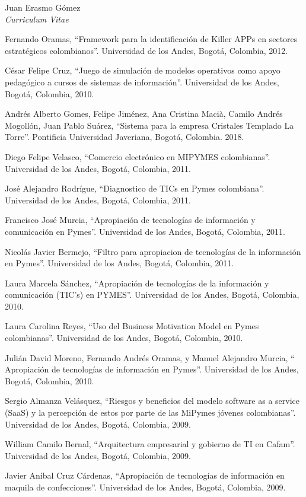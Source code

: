 \documentclass[10pt]{article}
\newenvironment{subbulletlist}{%
  \begin{list}{\labelitemii}{%
      \setlength{\topsep}{\itemsep}\setlength{\parskip}{\parsep}%
    }%
  }%
  { \end{list} }
\begin{document}
\begin{cv}{Juan Erasmo Gómez\\{\large \itshape Curriculum Vitae}}
\begin{cvlist}{}
\begin{subbulletlist}
    \item Fernando Oramas, ``Framework para la identificación de Killer APPs en sectores estratégicos colombianos''. Universidad de los Andes, Bogotá, Colombia, 2012.
    \item César Felipe Cruz, ``Juego de simulación de modelos operativos como apoyo pedagógico a cursos de sistemas de información''. Universidad de los Andes, Bogotá, Colombia, 2010.
    \end{subbulletlist}
  \item \textbf{}
    \begin{subbulletlist}
    \item Andrés Alberto Gomes, Felipe Jiménez, Ana Cristina Macià, Camilo Andrés Mogollón,  Juan Pablo Suárez, ``Sistema para la empresa Cristales Templado La Torre''. Pontificia Universidad Javeriana, Bogotá, Colombia. 2018.
    \item Diego Felipe Velasco, ``Comercio electrónico en MIPYMES colombianas''. Universidad de los Andes, Bogotá, Colombia, 2011.
    \item José Alejandro Rodrígue, ``Diagnostico de TICs en Pymes colombiana''. Universidad de los Andes, Bogotá, Colombia, 2011.
    \item Francisco José Murcia, ``Apropiación de tecnologías de información y comunicación en Pymes''. Universidad de los Andes, Bogotá, Colombia, 2011.
    \item Nicolás Javier Bermejo, ``Filtro para apropiacion de tecnologías de la información en Pymes''. Universidad de los Andes, Bogotá, Colombia, 2011.  
    \item Laura Marcela Sánchez, ``Apropiación de tecnologías de la información y comunicación (TIC's) en PYMES''. Universidad de los Andes, Bogotá, Colombia, 2010.
    \item Laura Carolina Reyes, ``Uso del Business Motivation Model en Pymes colombianas''. Universidad de los Andes, Bogotá, Colombia, 2010.
    \item Julián David Moreno, Fernando Andrés Oramas, y Manuel Alejandro Murcia, `` Apropiación de tecnologías de información en Pymes''. Universidad de los Andes, Bogotá, Colombia, 2010.
    \item Sergio Almanza Velásquez, ``Riesgos y beneficios del modelo software as a service (SaaS) y la percepción de estos por parte de las MiPymes jóvenes colombianas''. Universidad de los Andes, Bogotá, Colombia, 2009.
    \item  William Camilo Bernal, ``Arquitectura empresarial y gobierno de TI en Cafam''. Universidad de los Andes, Bogotá, Colombia, 2009.
    \item Javier Aníbal Cruz Cárdenas, ``Apropiación de tecnologías de información en maquila de confecciones''. Universidad de los Andes, Bogotá, Colombia, 2009.
    \end{subbulletlist}
  \end{cvlist}


\end{cv}
\end{document}

